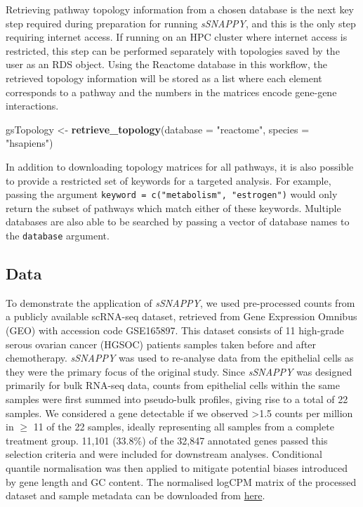 \documentclass[9pt,a4paper,]{extarticle}
\newenvironment{Shaded}{\begin{snugshade}}{\end{snugshade}}
\newcommand{\AttributeTok}[1]{\textcolor[rgb]{0.13,0.29,0.53}{#1}}
\newcommand{\FunctionTok}[1]{\textcolor[rgb]{0.13,0.29,0.53}{\textbf{#1}}}
\newcommand{\NormalTok}[1]{#1}
\newcommand{\OtherTok}[1]{\textcolor[rgb]{0.56,0.35,0.01}{#1}}
\newcommand{\StringTok}[1]{\textcolor[rgb]{0.31,0.60,0.02}{#1}}
\begin{document}
Retrieving pathway topology information from a chosen database is the next key step required during preparation for running \emph{sSNAPPY}, and this is the only step requiring internet access.
If running on an HPC cluster where internet access is restricted, this step can be performed separately with topologies saved by the user as an RDS object.
Using the Reactome database\citep{reactome2021} in this workflow, the retrieved topology information will be stored as a list where each element corresponds to a pathway and the numbers in the matrices encode gene-gene interactions.

\begin{Shaded}
\begin{Highlighting}[]
\NormalTok{gsTopology }\OtherTok{\textless{}{-}} \FunctionTok{retrieve\_topology}\NormalTok{(}\AttributeTok{database =} \StringTok{"reactome"}\NormalTok{, }\AttributeTok{species =} \StringTok{"hsapiens"}\NormalTok{)}
\end{Highlighting}
\end{Shaded}

In addition to downloading topology matrices for all pathways, it is also possible to provide a restricted set of keywords for a targeted analysis.
For example, passing the argument \texttt{keyword\ =\ c("metabolism",\ "estrogen")} would only return the subset of pathways which match either of these keywords.
Multiple databases are also able to be searched by passing a vector of database names to the \texttt{database} argument.

\hypertarget{data}{%
\subsection{Data}\label{data}}

To demonstrate the application of \emph{sSNAPPY}, we used pre-processed counts from a publicly available scRNA-seq dataset, retrieved from Gene Expression Omnibus (GEO) with accession code GSE165897.
This dataset consists of 11 high-grade serous ovarian cancer (HGSOC) patients samples taken before and after chemotherapy\citep{Zhang2022}.
\emph{sSNAPPY} was used to re-analyse data from the epithelial cells as they were the primary focus of the original study.
Since \emph{sSNAPPY} was designed primarily for bulk RNA-seq data, counts from epithelial cells within the same samples were first summed into pseudo-bulk profiles, giving rise to a total of 22 samples.
We considered a gene detectable if we observed \textgreater1.5 counts per million in \(\geq\) 11 of the 22 samples, ideally representing all samples from a complete treatment group.
11,101 (33.8\%) of the 32,847 annotated genes passed this selection criteria and were included for downstream analyses.
Conditional quantile normalisation\citep{Hansen2012} was then applied to mitigate potential biases introduced by gene length and GC content.
The normalised logCPM matrix of the processed dataset and sample metadata can be downloaded from \href{https://github.com/Wenjun-Liu/F1000_sSNAPPY_manuscript/tree/master/data}{here}.
\end{document}
